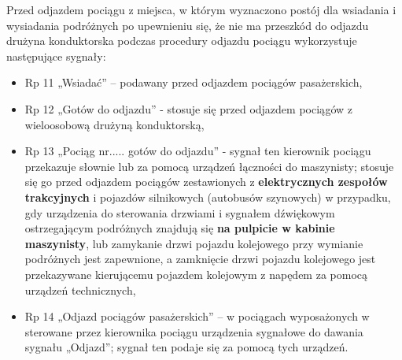 Przed odjazdem pociągu z miejsca, w którym wyznaczono postój dla wsiadania i wysiadania podróżnych po upewnieniu się, że nie ma przeszkód do
odjazdu drużyna konduktorska podczas procedury odjazdu pociągu wykorzystuje następujące sygnały:
\begin{itemize}
	\item Rp 11 „Wsiadać” – podawany przed odjazdem pociągów pasażerskich,
	\item Rp 12 „Gotów do odjazdu” - stosuje się przed odjazdem pociągów
	z wieloosobową drużyną konduktorską,
	\item  Rp 13 „Pociąg nr..... gotów do odjazdu” - sygnał ten kierownik pociągu przekazuje słownie lub za pomocą urządzeń łączności do maszynisty; stosuje 	się go przed odjazdem pociągów zestawionych z \textbf{elektrycznych zespołów trakcyjnych} i pojazdów silnikowych (autobusów szynowych) w przypadku, gdy urządzenia do sterowania drzwiami i sygnałem dźwiękowym ostrzegającym
	podróżnych znajdują się \textbf{na pulpicie w kabinie maszynisty}, lub zamykanie	drzwi pojazdu kolejowego przy wymianie podróżnych jest zapewnione,	a zamknięcie drzwi pojazdu kolejowego jest przekazywane kierującemu	pojazdem kolejowym z napędem za pomocą urządzeń technicznych,
	\item Rp 14 „Odjazd pociągów pasażerskich” – w pociągach wyposażonych w sterowane przez kierownika pociągu urządzenia sygnałowe do dawania
	sygnału „Odjazd”; sygnał ten podaje się za pomocą tych urządzeń.
\end{itemize}

